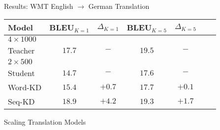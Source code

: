 \begin{frame}{Results: WMT English $\rightarrow$ German Translation}
\air
\air
\begin{table}
\centering
\begin{tabular}{lccccrr}
\toprule
Model &    BLEU$_{K=1}$   & $\Delta_{K=1}$ & BLEU$_{K=5}$ & $\Delta_{K=5}$ \\%
\midrule
$4 \times 1000$ \\
Teacher    & $17.7$ &  $-$ & $19.5$&   $-$ \\%
\midrule
\pause
$2 \times 500$ \\
Student  $\,$   & $14.7$ & $-$ & $17.6$&  $-$ \\%
\hspace{1mm} Word-KD  & $15.4$ & $+0.7$& $17.7$& $+0.1$\\%
\pause
\hspace{1mm} Seq-KD  & $18.9$ & $+\mathbf{4.2}$&$19.3$ & $+\mathbf{1.7}$ \\ %
\bottomrule
\end{tabular}

\end{table}
\air
\air
\end{frame}



\begin{frame}{Scaling Translation Models}

  \begin{center}
  \end{center}
\end{frame}

